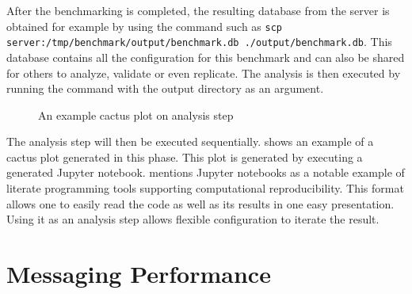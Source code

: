 After the benchmarking is completed, the resulting database from the server is obtained for example by using the  command such as \texttt{scp server:/tmp/benchmark/output/benchmark.db ./output/benchmark.db}.
This database contains all the configuration for this benchmark and can also be shared for others to analyze, validate or even replicate.
The analysis is then executed by running the  command with the output directory as an argument.

\begin{figure}
	\centering
	\caption{An example cactus plot on analysis step}
	\label{fig:eval.cactus}
\end{figure}

The analysis step will then be executed sequentially.
 shows an example of a cactus plot generated in this phase.
This plot is generated by executing a generated Jupyter notebook.
\citet{piccoloToolsTechniquesComputational2016} mentions Jupyter notebooks as a notable example of literate programming tools supporting computational reproducibility.
This format allows one to easily read the code as well as its results in one easy presentation.
Using it as an analysis step allows flexible configuration to iterate the result.

\section{Messaging Performance}
\label{sec:eval.messaging}

